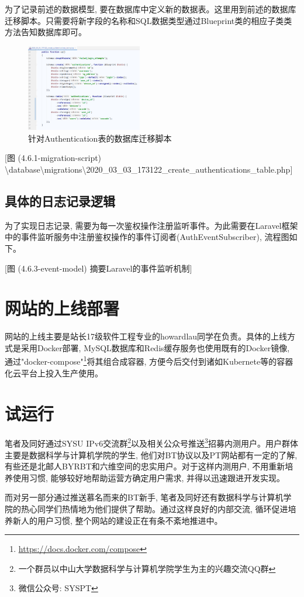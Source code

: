 为了记录前述的数据模型, 要在数据库中定义新的数据表。这里用到前述的数据库迁移脚本。只需要将新字段的名称和SQL数据类型通过Blueprint类的相应子类类方法告知数据库即可。

\begin{figure}[h]
    \centering
    \includegraphics[width=0.45\textwidth]{support-files/4.6.1-migration-script.png}
    \caption{针对Authentication表的数据库迁移脚本}
    \label{fig:authmigratescript}
\end{figure}

[图 (4.6.1-migration-script) \textbackslash database\textbackslash migrations\textbackslash 2020\_03\_03\_173122\_create\_authentications\_table.php]

\subsection{具体的日志记录逻辑}

为了实现日志记录, 需要为每一次鉴权操作注册监听事件。为此需要在Laravel框架中的事件监听服务中注册鉴权操作的事件订阅者(AuthEventSubscriber), 流程图如下。

[图 (4.6.3-event-model) 摘要Laravel的事件监听机制]


\section{网站的上线部署}

网站的上线主要是站长17级软件工程专业的howardlau同学在负责。具体的上线方式是采用Docker部署, MySQL数据库和Redis缓存服务也使用既有的Docker镜像, 通过"docker-compose"\footnote{\url{https://docs.docker.com/compose}}将其组合成容器, 方便今后交付到诸如Kubernete等的容器化云平台上投入生产使用。

\section{试运行}
\label{sec:preop}

笔者及同好通过SYSU IPv6交流群\footnote{一个群员以中山大学数据科学与计算机学院学生为主的兴趣交流QQ群}以及相关公众号推送\footnote{微信公众号: SYSPT}招募内测用户。用户群体主要是数据科学与计算机学院的学生, 他们对BT协议以及PT网站都有一定的了解, 有些还是北邮人BYRBT和六维空间的忠实用户。对于这样内测用户, 不用重新培养使用习惯, 能够较好地帮助运营方确定用户需求, 并得以迅速跟进开发实现。

而对另一部分通过推送慕名而来的BT新手, 笔者及同好还有数据科学与计算机学院的热心同学们热情地为他们提供了帮助。通过这样良好的内部交流, 循环促进培养新人的用户习惯, 整个网站的建设正在有条不紊地推进中。
